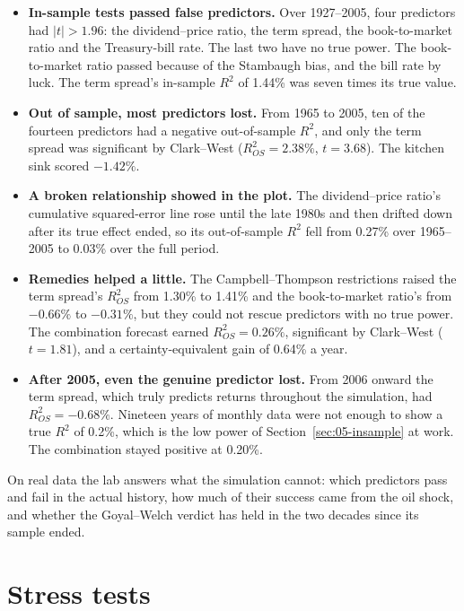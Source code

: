 \begin{itemize}
  \item \textbf{In-sample tests passed false predictors.} Over 1927--2005, four predictors had $|t| > 1.96$: the dividend--price ratio, the term spread, the book-to-market ratio and the Treasury-bill rate. The last two have no true power. The book-to-market ratio passed because of the Stambaugh bias, and the bill rate by luck. The term spread's in-sample $R^2$ of 1.44\% was seven times its true value.
  \item \textbf{Out of sample, most predictors lost.} From 1965 to 2005, ten of the fourteen predictors had a negative out-of-sample $R^2$, and only the term spread was significant by Clark--West ($R^2_{OS} = 2.38\%$, $t = 3.68$). The kitchen sink scored $-1.42\%$.
  \item \textbf{A broken relationship showed in the plot.} The dividend--price ratio's cumulative squared-error line rose until the late 1980s and then drifted down after its true effect ended, so its out-of-sample $R^2$ fell from 0.27\% over 1965--2005 to 0.03\% over the full period.
  \item \textbf{Remedies helped a little.} The Campbell--Thompson restrictions raised the term spread's $R^2_{OS}$ from 1.30\% to 1.41\% and the book-to-market ratio's from $-0.66\%$ to $-0.31\%$, but they could not rescue predictors with no true power. The combination forecast earned $R^2_{OS} = 0.26\%$, significant by Clark--West ($t = 1.81$), and a certainty-equivalent gain of 0.64\% a year.
  \item \textbf{After 2005, even the genuine predictor lost.} From 2006 onward the term spread, which truly predicts returns throughout the simulation, had $R^2_{OS} = -0.68\%$. Nineteen years of monthly data were not enough to show a true $R^2$ of 0.2\%, which is the low power of Section~\ref{sec:05-insample} at work. The combination stayed positive at 0.20\%.
\end{itemize}

On real data the lab answers what the simulation cannot: which predictors pass and fail in the actual history, how much of their success came from the oil shock, and whether the Goyal--Welch verdict has held in the two decades since its sample ended.

\section{Stress tests}
\label{sec:05-stress}

